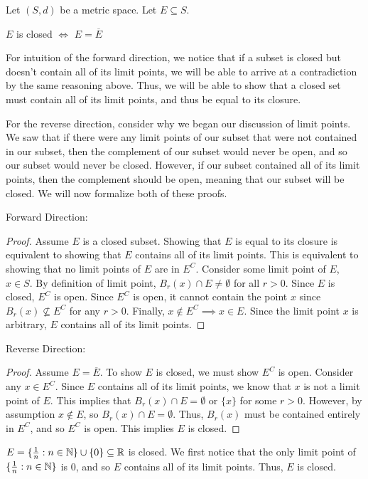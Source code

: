 \begin{thm}{}{}
Let \((S, d)\) be a metric space. Let \(E \subseteq S\). \newline 

\(E\) is closed \(\iff\) \(E = \overline{E}\) \newline 

For intuition of the forward direction, we notice that if a subset is closed but doesn't contain all of its limit points, we will be able to arrive at a contradiction by the same reasoning above. Thus, we will be able to show that a closed set must contain all of its limit points, and thus be equal to its closure.\newline

For the reverse direction, consider why we began our discussion of limit points. We saw that if there were any limit points of our subset that were not contained in our subset, then the complement of our subset would never be open, and so our subset would never be closed. However, if our subset contained all of its limit points, then the complement should be open, meaning that our subset will be closed. We will now formalize both of these proofs. \newline 

Forward Direction:
\begin{proof}
Assume \(E\) is a closed subset. Showing that \(E\) is equal to its closure is equivalent to showing that \(E\) contains all of its limit points. This is equivalent to showing that no limit points of \(E\) are in \(E^C\). Consider some limit point of \(E\), \(x \in S\). By definition of limit point, \(B_r(x) \cap E \not = \emptyset\) for all \(r > 0\). Since \(E\) is closed, \(E^C\) is open. Since \(E^C\) is open, it cannot contain the point \(x\) since \(B_r(x)\not\subseteq E^C\) for any \(r > 0\). Finally, \(x \not\in E^C \implies x \in E\). Since the limit point \(x\) is arbitrary, \(E\) contains all of its limit points.
\end{proof}
Reverse Direction: 
\begin{proof}
Assume \(E = \overline{E}\). To show \(E\) is closed, we must show \(E^C\) is open. Consider any \(x \in E^C\). Since \(E\) contains all of its limit points, we know that \(x\) is not a limit point of \(E\). This implies that \(B_r(x) \cap E = \emptyset \textrm{ or } \{x\}\) for some \(r > 0\). However, by assumption \(x \not\in E\), so \(B_r(x) \cap E = \emptyset\). Thus, \(B_r(x)\) must be contained entirely in \(E^C\), and so \(E^C\) is open. This implies \(E\) is closed.
\end{proof}
\end{thm}
\begin{exmp}{}{}
\(E = \{ \frac{1}{n} : n \in {\mathbb N} \} \cup \{0\} \subseteq {\mathbb R}\) is closed. We first notice that the only limit point of \(\{ \frac{1}{n} : n \in {\mathbb N} \}\) is 0, and so \(E\) contains all of its limit points. Thus, \(E\) is closed.
\end{exmp}



